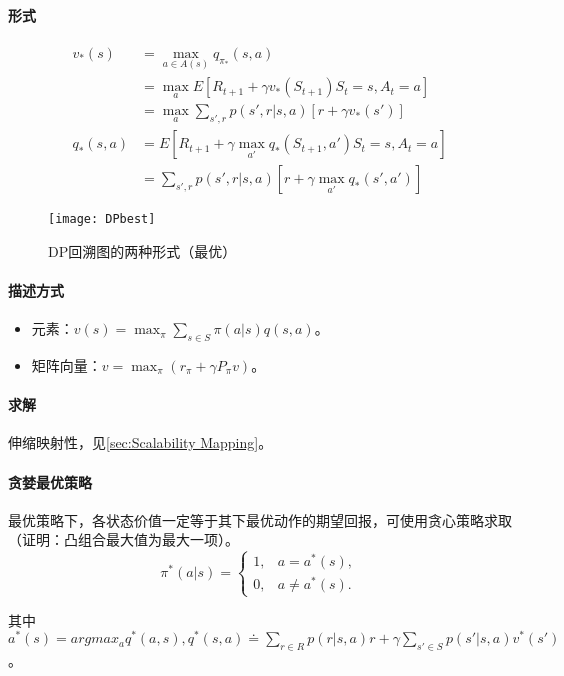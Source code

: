 \documentclass[
12pt, %
a4paper, 
oneside, %
headinclude,footinclude, %
]{scrartcl}
\begin{document}
\paragraph{形式}
\begin{align*}
v_*(s) 
&= \max_{a \in A(s)} q_{\pi_*}(s, a) \\
&= \max_a E[R_{t + 1} + \gamma v_*(S_{t + 1})  S_t = s, A_t = a] \\
&= \max_a \sum_{s', r} p(s', r|s, a)[r + \gamma v_*(s')] \\
q_*(s, a) 
&= E[R_{t + 1} + \gamma \max_{a'} q_*(S_{t + 1}, a')  S_t = s, A_t = a] \\
&= \sum_{s', r} p(s', r|s, a)[r + \gamma \max_{a'} q_*(s', a')]
\end{align*}

\begin{figure}[H]
\centering 
\texttt{[image: DPbest]} 
\caption[DP回溯图的两种形式（最优）]{DP回溯图的两种形式（最优）}
\end{figure}
\paragraph{描述方式}
\begin{itemize}
\item 元素：$ v(s) = \max_{\pi} \sum_{s \in S}\pi(a|s)q(s,a) $。
\item 矩阵向量：$ v = \max_{\pi} (r_\pi + \gamma P_\pi v) $。
\end{itemize}
\paragraph{求解}
伸缩映射性，见\ref{sec:Scalability Mapping}。\label{sec:Scalability Mapping back}
\paragraph{贪婪最优策略}
最优策略下，各状态价值一定等于其下最优动作的期望回报，可使用贪心策略求取（证明：凸组合最大值为最大一项）。
$$
\pi^*(a|s) = 
\begin{cases}
1, & a = a^*(s), \\
0, & a \neq a^*(s).
\end{cases}
$$

其中$ a^*(s) = argmax_a q^*(a, s), q^*(s, a) \doteq \sum_{r \in R} p(r|s, a) r + \gamma \sum_{s' \in S} p(s'|s, a) v^*(s') $。
\end{document}
